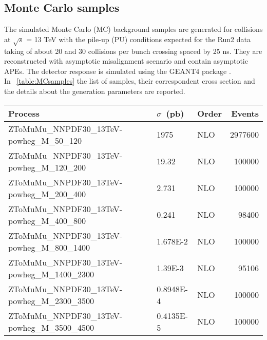 \subsection{Monte Carlo samples}
The simulated Monte Carlo (MC) background samples are generated for collisions at $\sqrt{s}$ = 13 TeV with the pile-up (PU) conditions expected for the Run2 data taking of about 20 and 30 collisions per bunch crossing spaced by 25 ns. They are reconstructed with asymptotic misalignment scenario and contain asymptotic APEs. The detector response is simulated using the GEANT4 package \cite{GEANT4}.\\
In ~\ref{table:MCsamples} the list of samples, their correspondent cross section and the details about the generation parameters are reported. \\
\begin{table}[htbp!]
{\footnotesize
\begin{tabular}{|l|l|l|r|}
\hline
Process                                                                                 & $\sigma$~(pb) & Order & Events \\ %
\hline\hline                                                                                                       %
ZToMuMu\_NNPDF30\_13TeV-powheg\_M\_50\_120						&  1975      & NLO  &   2977600 \\ %
ZToMuMu\_NNPDF30\_13TeV-powheg\_M\_120\_200                                               &  19.32     & NLO  &    100000 \\ %
ZToMuMu\_NNPDF30\_13TeV-powheg\_M\_200\_400                                               &  2.731     & NLO  &    100000 \\ %
ZToMuMu\_NNPDF30\_13TeV-powheg\_M\_400\_800                                               &  0.241     & NLO  &     98400 \\ %
ZToMuMu\_NNPDF30\_13TeV-powheg\_M\_800\_1400                                              &  1.678E-2  & NLO  &    100000 \\ %
ZToMuMu\_NNPDF30\_13TeV-powheg\_M\_1400\_2300                                             &  1.39E-3   & NLO  &     95106 \\ %
ZToMuMu\_NNPDF30\_13TeV-powheg\_M\_2300\_3500                                             &  0.8948E-4 & NLO  &    100000 \\ %
ZToMuMu\_NNPDF30\_13TeV-powheg\_M\_3500\_4500                                             &  0.4135E-5 & NLO  &    100000 \\ %

\end{tabular}}
\end{table}
